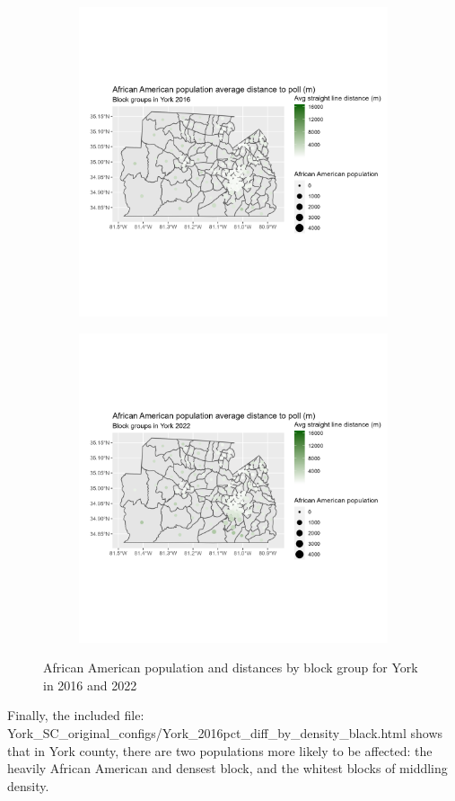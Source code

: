 \documentclass[11pt]{article}
\theoremstyle{remark}
\theoremstyle{definition}
\begin{document}
\begin{figure}
	\begin{subfigure}{.5\textwidth}
		\centering
		\includegraphics[width=\linewidth]{result_analysis/York_SC_original_configs/black_pop_and_dist_York_config_original_2016_polls.png}
		\label{sfig:York_2016_bg_dist_pop}
	\end{subfigure} 
	\begin{subfigure}{.5\textwidth}
		\centering
		\includegraphics[width=\linewidth]{result_analysis/York_SC_original_configs/black_pop_and_dist_York_config_original_2022_polls.png}
		\label{sfig:York_2022_bg_dist}
	\end{subfigure}
	\caption{African American population and distances by block group for York in 2016 and 2022}
	\label{fig:York distance Black population maps}
\end{figure}

Finally, the included file: \textrm{York\_SC\_original\_configs/York\_2016pct\_diff\_by\_density\_black.html} shows that in York county, there are two populations more likely to be affected: the heavily African American and densest block, and the whitest blocks of middling density. 
\end{document}
